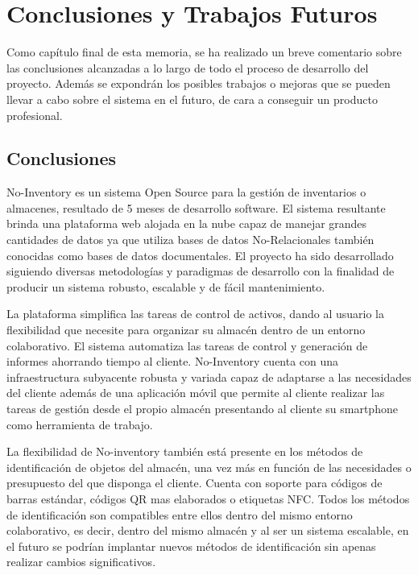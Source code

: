 \documentclass[a4paper,11pt]{book}
\begin{document}
\chapter{Conclusiones y Trabajos Futuros}

Como capítulo final de esta memoria, se ha realizado un breve comentario sobre las conclusiones alcanzadas a lo largo de todo el proceso de desarrollo del proyecto. Además se expondrán los posibles trabajos o mejoras que se pueden llevar a cabo sobre el sistema en el futuro, de cara a conseguir un producto profesional. 

\section{Conclusiones}

No-Inventory es un sistema Open Source para la gestión de inventarios o almacenes, resultado de 5 meses de desarrollo software. El sistema resultante brinda una plataforma web alojada en la nube capaz de manejar grandes cantidades de datos ya que utiliza bases de datos No-Relacionales también conocidas como bases de datos documentales. El proyecto ha sido desarrollado siguiendo diversas metodologías y paradigmas de desarrollo con la finalidad de producir un sistema robusto, escalable y de fácil mantenimiento. 

La plataforma simplifica las tareas de control de activos, dando al usuario la flexibilidad que necesite para organizar su almacén dentro de un entorno colaborativo. El sistema automatiza las tareas de control y generación de informes  ahorrando tiempo al cliente. No-Inventory cuenta con una infraestructura subyacente robusta y variada capaz de adaptarse a las necesidades del cliente además de una aplicación móvil que permite al cliente realizar las tareas de gestión desde el propio almacén presentando al cliente su smartphone como herramienta de trabajo. 

La flexibilidad de No-inventory también está presente en los métodos de identificación  de objetos del almacén, una vez más en función de las necesidades o presupuesto del que disponga el cliente. Cuenta con soporte para códigos de barras estándar, códigos QR mas elaborados o etiquetas NFC. Todos los métodos de identificación son compatibles entre ellos dentro del mismo entorno colaborativo, es decir, dentro del mismo almacén y al ser un sistema escalable, en el futuro se podrían implantar nuevos métodos de identificación sin apenas realizar cambios significativos. 
 
\end{document}

